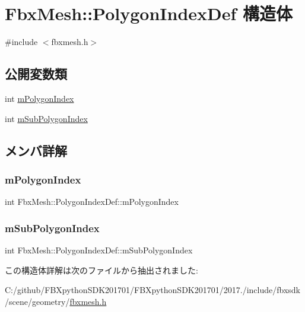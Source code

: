 \hypertarget{struct_fbx_mesh_1_1_polygon_index_def}{}\section{Fbx\+Mesh\+:\+:Polygon\+Index\+Def 構造体}
\label{struct_fbx_mesh_1_1_polygon_index_def}


{\ttfamily \#include $<$fbxmesh.\+h$>$}

\subsection*{公開変数類}
\begin{DoxyCompactItemize}
\item 
int \hyperlink{struct_fbx_mesh_1_1_polygon_index_def_a5166ed1381f4a0d1be4c1a8db56abca2}{m\+Polygon\+Index}
\item 
int \hyperlink{struct_fbx_mesh_1_1_polygon_index_def_a082dbd8eba06dff88ab65e33c1582005}{m\+Sub\+Polygon\+Index}
\end{DoxyCompactItemize}


\subsection{メンバ詳解}
\mbox{\label{struct_fbx_mesh_1_1_polygon_index_def_a5166ed1381f4a0d1be4c1a8db56abca2}} 
\subsubsection{\texorpdfstring{m\+Polygon\+Index}{mPolygonIndex}}
{\footnotesize\ttfamily int Fbx\+Mesh\+::\+Polygon\+Index\+Def\+::m\+Polygon\+Index}

\mbox{\label{struct_fbx_mesh_1_1_polygon_index_def_a082dbd8eba06dff88ab65e33c1582005}} 
\subsubsection{\texorpdfstring{m\+Sub\+Polygon\+Index}{mSubPolygonIndex}}
{\footnotesize\ttfamily int Fbx\+Mesh\+::\+Polygon\+Index\+Def\+::m\+Sub\+Polygon\+Index}



この構造体詳解は次のファイルから抽出されました\+:\begin{DoxyCompactItemize}
\item 
C\+:/github/\+F\+B\+Xpython\+S\+D\+K201701/\+F\+B\+Xpython\+S\+D\+K201701/2017./include/fbxsdk/scene/geometry/\hyperlink{fbxmesh_8h}{fbxmesh.\+h}\end{DoxyCompactItemize}

